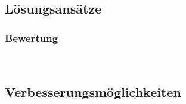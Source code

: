 \subsection{Lösungsansätze}
\label{Stand der Technik:Lösungsansätze}


\subsubsection{Bewertung}~\\


\subsection{Verbesserungsmöglichkeiten}
\label{Stand der Technik:Verbesserungsmöglichkeiten}


